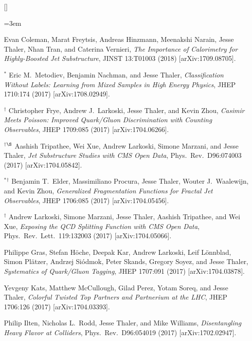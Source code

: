 \begin{list}{[]\addtocounter{jessecount}{-1}}{\leftmargin=3em \itemsep=4pt}
\item
 Evan Coleman, Marat Freytsis, Andreas Hinzmann, Meenakshi Narain, Jesse Thaler, Nhan Tran, and Caterina Vernieri,
\emph{The Importance of Calorimetry for Highly-Boosted Jet Substructure},
JINST 13:T01003 (2018)
[arXiv:1709.08705].

\item
${}^\ast$ Eric M.\ Metodiev, Benjamin Nachman, and Jesse Thaler,
\emph{Classification Without Labels: Learning from Mixed Samples in High Energy Physics},
JHEP 1710:174 (2017)
[arXiv:1708.02949].

\item
${}^\dagger$ Christopher Frye, Andrew J.\ Larkoski, Jesse Thaler, and Kevin Zhou,
\emph{Casimir Meets Poisson: Improved Quark/Gluon Discrimination with Counting Observables},
JHEP 1709:085 (2017)
[arXiv:1704.06266].

\item
${}^\dagger$${}^\S$ Aashish Tripathee, Wei Xue, Andrew Larkoski, Simone Marzani, and Jesse Thaler,
\emph{Jet Substructure Studies with CMS Open Data},
Phys.\ Rev.\ D96:074003 (2017)
[arXiv:1704.05842].

\item
${}^\ast$${}^\dagger$ Benjamin T.\ Elder, Massimiliano Procura, Jesse Thaler, Wouter J.\ Waalewijn, and Kevin Zhou,
\emph{Generalized Fragmentation Functions for Fractal Jet Observables},
JHEP 1706:085 (2017)
[arXiv:1704.05456].

\item
${}^\dagger$ Andrew Larkoski, Simone Marzani, Jesse Thaler, Aashish Tripathee, and Wei Xue,
\emph{Exposing the QCD Splitting Function with CMS Open Data},
Phys.\ Rev.\ Lett.\ 119:132003 (2017)
[arXiv:1704.05066].

\item
 Philippe Gras, Stefan Höche, Deepak Kar, Andrew Larkoski, Leif Lönnblad, Simon Plätzer, Andrzej Siódmok, Peter Skands, Gregory Soyez, and Jesse Thaler,
\emph{Systematics of Quark/Gluon Tagging},
JHEP 1707:091 (2017)
[arXiv:1704.03878].

\item
 Yevgeny Kats, Matthew McCullough, Gilad Perez, Yotam Soreq, and Jesse Thaler,
\emph{Colorful Twisted Top Partners and Partnerium at the LHC},
JHEP 1706:126 (2017)
[arXiv:1704.03393].

\item
 Philip Ilten, Nicholas L.\ Rodd, Jesse Thaler, and Mike Williams,
\emph{Disentangling Heavy Flavor at Colliders},
Phys.\ Rev.\ D96:054019 (2017)
[arXiv:1702.02947].


\end{list}
